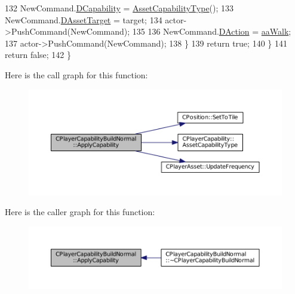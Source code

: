 \begin{DoxyCode}
132             NewCommand.\hyperlink{structSAssetCommand_a734ea7c6847457b437360f333f570ff9}{DCapability} = \hyperlink{classCPlayerCapability_a433bb196cd6ab6a932f1cac102b3aa98}{AssetCapabilityType}();
133             NewCommand.\hyperlink{structSAssetCommand_a3d9b43f6e59c386c48c41a65448a0c39}{DAssetTarget} = target;
134             actor->PushCommand(NewCommand);
135             
136             NewCommand.\hyperlink{structSAssetCommand_a8edd3b3d59a76d5514ba403bc8076a75}{DAction} = \hyperlink{GameDataTypes_8h_ab47668e651a3032cfb9c40ea2d60d670a60ca9010aa62b73c1aab838ff4bf7276}{aaWalk};
137             actor->PushCommand(NewCommand);
138         \}
139         \textcolor{keywordflow}{return} \textcolor{keyword}{true};
140     \}
141     \textcolor{keywordflow}{return} \textcolor{keyword}{false};
142 \}
\end{DoxyCode}
Here is the call graph for this function\+:\nopagebreak
\begin{figure}[H]
\begin{center}
\leavevmode
\includegraphics[width=350pt]{classCPlayerCapabilityBuildNormal_afc2fbda17580385a4028d44cd03c9149_cgraph}
\end{center}
\end{figure}
Here is the caller graph for this function\+:\nopagebreak
\begin{figure}[H]
\begin{center}
\leavevmode
\includegraphics[width=350pt]{classCPlayerCapabilityBuildNormal_afc2fbda17580385a4028d44cd03c9149_icgraph}
\end{center}
\end{figure}
\hypertarget{classCPlayerCapabilityBuildNormal_a1a8c6fdd9d8a91ecb7417163279e2276}{}\label{classCPlayerCapabilityBuildNormal_a1a8c6fdd9d8a91ecb7417163279e2276} 
